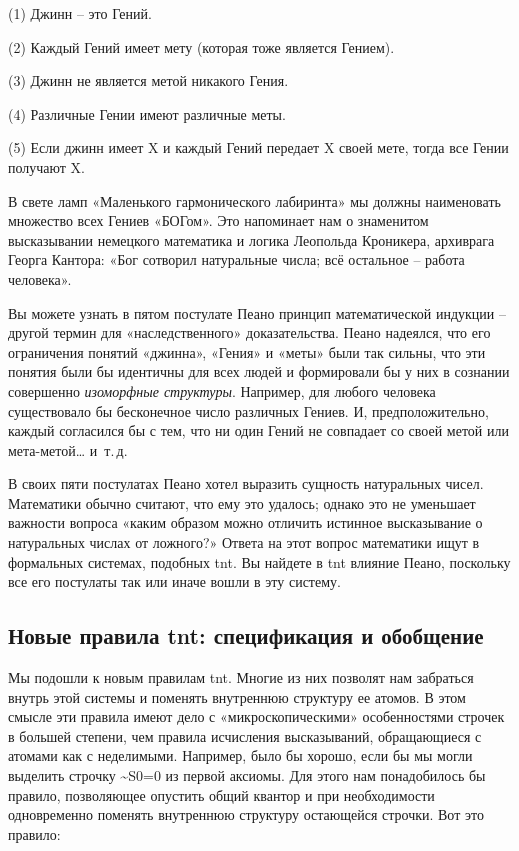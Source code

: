 \documentclass[../main.tex]{subfiles}
\begin{document}
(1) Джинн \--- это Гений.

(2) Каждый Гений имеет мету (которая тоже является Гением).

(3) Джинн не является метой никакого Гения.

(4) Различные Гении имеют различные меты.

(5) Если джинн имеет X и каждый Гений передает X своей мете, тогда все Гении получают X.

В свете ламп «Маленького гармонического лабиринта» мы должны наименовать множество всех Гениев «БОГом». Это напоминает нам о знаменитом высказывании немецкого математика и логика Леопольда Кроникера, архиврага Георга Кантора: «Бог сотворил натуральные числа; всё остальное \--- работа человека».

Вы можете узнать в пятом постулате Пеано принцип математической индукции \--- другой термин для «наследственного» доказательства. Пеано надеялся, что его ограничения понятий «джинна», «Гения» и «меты» были так сильны, что эти понятия были бы идентичны для всех людей и формировали бы у них в сознании совершенно \emph{изоморфные структуры}. Например, для любого человека существовало бы бесконечное число различных Гениев. И, предположительно, каждый согласился бы с тем, что ни один Гений не совпадает со своей метой или мета-метой\ldots{} и~т.\,д.

В своих пяти постулатах Пеано хотел выразить сущность натуральных чисел. Математики обычно считают, что ему это удалось; однако это не уменьшает важности вопроса «каким образом можно отличить истинное высказывание о натуральных числах от ложного?» Ответа на этот вопрос математики ищут в формальных системах, подобных \acs{tnt}. Вы найдете в \acs{tnt} влияние Пеано, поскольку все его постулаты так или иначе вошли в эту систему.


\subsection{Новые правила \acs{tnt}: спецификация и обобщение}

Мы подошли к новым правилам \acs{tnt}. Многие из них позволят нам забраться внутрь этой системы и поменять внутреннюю структуру ее атомов. В этом смысле эти правила имеют дело с «микроскопическими» особенностями строчек в большей степени, чем правила исчисления высказываний, обращающиеся с атомами как с неделимыми. Например, было бы хорошо, если бы мы могли выделить строчку \textasciitilde S0=0 из первой аксиомы. Для этого нам понадобилось бы правило, позволяющее опустить общий квантор и при необходимости одновременно поменять внутреннюю структуру остающейся строчки. Вот это правило:
\end{document}
